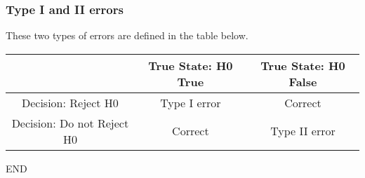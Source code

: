 \documentclass[]{beamer}
\begin{document}
\begin{frame}
\frametitle{Type I and II errors}
\large
These two types of errors are defined in the table below.
\small
\begin{center}
\begin{tabular}{|c|c|c|}
\hline
&True State: H0 True & True State: H0 False\\\hline
Decision: Reject H0 & Type I error& Correct\\\hline
Decision: Do not Reject H0 & Correct &Type II error\\ \hline
\end{tabular}
\end{center}
\end{frame}

\begin{frame}
END
\end{frame}
\end{document}
